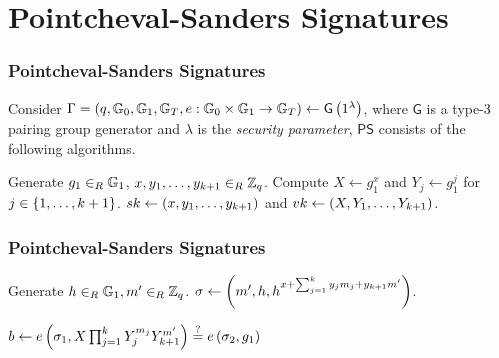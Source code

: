 \documentclass{beamer}
\begin{document}
    \section{Pointcheval-Sanders Signatures}
    \begin{frame}
        \frametitle{Pointcheval-Sanders Signatures}
        Consider \(\Gamma = \left(q, \mathbb G_0, \mathbb G_1, \mathbb G_T, e: \mathbb G_0 \times \mathbb G_1
        \rightarrow \mathbb G_T\right) \leftarrow \mathsf{G}\left(1^{\lambda}\right)\), where
        \(\mathsf{G}\) is a type-3 pairing group generator and \(\lambda\) is
        the \emph{security parameter}, \(\mathsf{PS}\) consists of the following
        algorithms.
        \begin{algorithm}[H]
            \caption{\(\mathsf{PS.KG}\)}
            \label{alg:ps-kg}
            \begin{algorithmic}[1]
                \State Generate \(g_1 \in_R \mathbb G_1\), \(x, y_1, \ldots, y_{k+1} \in_R \mathbb Z_q\).
                \State Compute \(X \gets g_1^x\) and \(Y_j \gets g_1^j\) for \(j \in \left\{1, \ldots, k+1\right\}\).
                \State \Return \(sk \gets \left(x, y_1, \ldots, y_{k+1}\right)\) and \(vk \gets \left(X, Y_1, \ldots, Y_{k+1}\right)\).
            \end{algorithmic}
        \end{algorithm}
    \end{frame}

    \begin{frame}
        \frametitle{Pointcheval-Sanders Signatures}
        \begin{algorithm}[H]
            \caption{\(\mathsf{PS.Sign}\)}
            \label{alg:ps-sign}
            \begin{algorithmic}[1]
                \State Generate \(h \in_R \mathbb G_1, m^{\prime} \in_R \mathbb Z_q\).
                \State \Return \(\sigma \gets \left(m^{\prime}, h, h^{x + \sum_{j=1}^ky_jm_j + y_{k+1}m^{\prime}}\right)\).
            \end{algorithmic}
        \end{algorithm}

        \begin{algorithm}[H]
            \caption{\(\mathsf{PS.Vf}\)}
            \label{alg:ps-vf}
            \begin{algorithmic}[1]
                \State \Return \(b \gets e\left(\sigma_1, X\prod_{j=1}^kY_j^{m_j}Y_{k+1}^{m^{\prime}}\right) \stackrel{?}{=} e\left(\sigma_2, g_1\right)\)
            \end{algorithmic}
        \end{algorithm}
    \end{frame}
\end{document}
